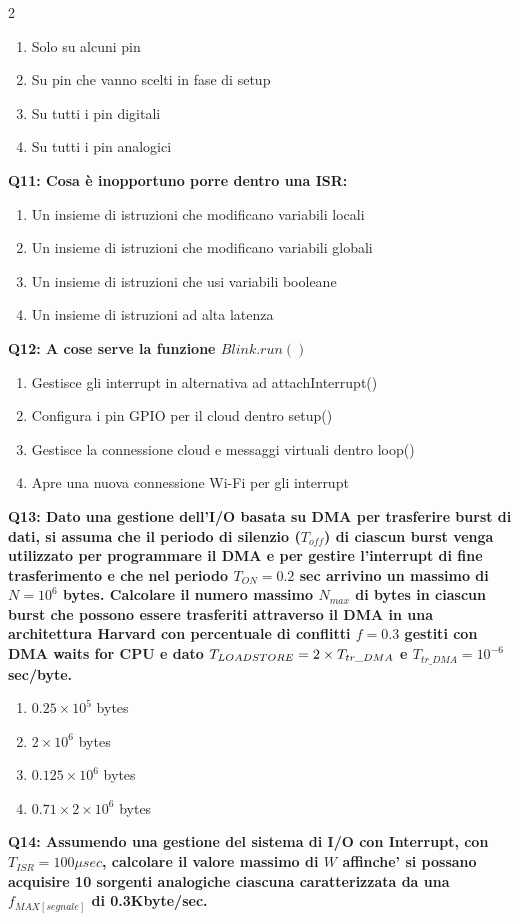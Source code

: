 \documentclass[10pt]{article}
\begin{document}
\begin{multicols}{2}
\begin{enumerate}[label=\arabic*.]
\item Solo su alcuni pin
\item Su pin che vanno scelti in fase di setup
\item Su tutti i pin digitali
\item Su tutti i pin analogici
\end{enumerate}
\textbf{Q11: Cosa è inopportuno porre dentro una ISR:}

\begin{enumerate}[label=\arabic*.]
\item Un insieme di istruzioni che modificano variabili locali
\item Un insieme di istruzioni che modificano variabili globali
\item Un insieme di istruzioni che usi variabili booleane
\item Un insieme di istruzioni ad alta latenza
\end{enumerate}
\textbf{Q12: A cose serve la funzione $Blink.run()$}

\begin{enumerate}[label=\arabic*.]
\item Gestisce gli interrupt in alternativa ad attachInterrupt()
\item Configura i pin GPIO per il cloud dentro setup()
\item Gestisce la connessione cloud e messaggi virtuali dentro loop()
\item Apre una nuova connessione Wi-Fi per gli interrupt
\end{enumerate}
\textbf{Q13: Dato una gestione dell’I/O basata su DMA per trasferire burst di dati, si assuma che il periodo di silenzio  ($T_{off}$) di ciascun burst venga utilizzato per programmare il DMA e per gestire l’interrupt di fine trasferimento e che nel periodo $T_{ON} = 0.2$ sec arrivino un massimo di $N=10^6$ bytes. Calcolare il numero massimo $N_{max}$ di bytes in ciascun burst che possono essere trasferiti attraverso il DMA in una architettura Harvard con percentuale di conflitti $f = 0.3$ gestiti con DMA waits for CPU e dato $T_{LOAD\/STORE} = 2 \times T_{tr\_DMA}$ e $T_{tr\_DMA} = 10^{-6}$ sec/byte.}

\begin{enumerate}[label=\arabic*.]
\item $0.25 \times 10^5$ bytes
\item $2 \times 10^6$ bytes
\item $0.125 \times 10^6$ bytes
\item $0.71 \times 2 \times 10^6$ bytes
\end{enumerate}
\textbf{Q14: Assumendo una gestione del sistema di I/O con Interrupt, con $T_{ISR}=100\mu sec$, calcolare il valore massimo di $W$ affinche' si possano acquisire 10 sorgenti analogiche ciascuna caratterizzata da una $f_{MAX[segnale]}$ di 0.3Kbyte/sec.}


\end{multicols}
\end{document}
